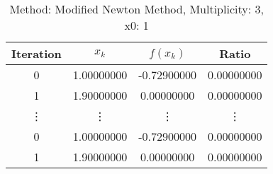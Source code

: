 \begin{table}
\centering
\caption{Method: Modified Newton Method, Multiplicity: 3, x0: 1}
\label{tab:table_Modified_Newton_Method_3_1}
\begin{tabular}{c c c c}
\toprule
Iteration &      $x_k$ &    $f(x_k)$ &      Ratio \\
\midrule
        0 & 1.00000000 & -0.72900000 & 0.00000000 \\
        1 & 1.90000000 &  0.00000000 & 0.00000000 \\
   \vdots &     \vdots &      \vdots &     \vdots \\
        0 & 1.00000000 & -0.72900000 & 0.00000000 \\
        1 & 1.90000000 &  0.00000000 & 0.00000000 \\
\bottomrule
\end{tabular}
\end{table}
